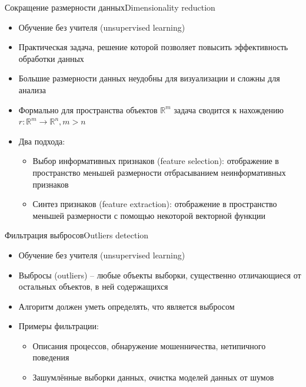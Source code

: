 \documentclass[compress,red,unicode]{beamer}
\begin{document}
\begin{frame}{Сокращение размерности данных}{Dimensionality reduction}
	\begin{itemize}
		\item Обучение без учителя (unsupervised learning)
		\item Практическая задача, решение которой позволяет повысить эффективность обработки данных
		\item Большие размерности данных неудобны для визуализации и сложны для анализа
		\item Формально для пространства объектов $\mathbb{R}^m$ задача сводится к нахождению $r: \mathbb{R}^m \to \mathbb{R}^n, m>n$
		\item Два подхода:
		\begin{itemize}
			\item Выбор информативных признаков (feature selection): {\color{main!50!black} отображение в пространство меньшей размерности отбрасыванием неинформативных признаков}
			\item Синтез признаков (feature extraction): {\color{main!50!black} отображение в пространство меньшей размерности с помощью некоторой векторной функции}
		\end{itemize}
	\end{itemize}

\end{frame}


\begin{frame}{Фильтрация выбросов}{Outliers detection}
	\begin{itemize}
		\item Обучение без учителя (unsupervised learning)
		\item Выбросы (outliers) -- любые объекты выборки, существенно отличающиеся от остальных объектов, в ней содержащихся 
		\item Алгоритм должен уметь определять, что является выбросом
		\item Примеры фильтрации:
		\begin{itemize}
			\item Описания процессов, {\color{main!90!black} обнаружение мошенничества, нетипичного поведения}
			\item Зашумлённые выборки данных, {\color{main!90!black} очистка моделей данных от шумов}
		\end{itemize}

	\end{itemize}
\end{frame}
\end{document}
